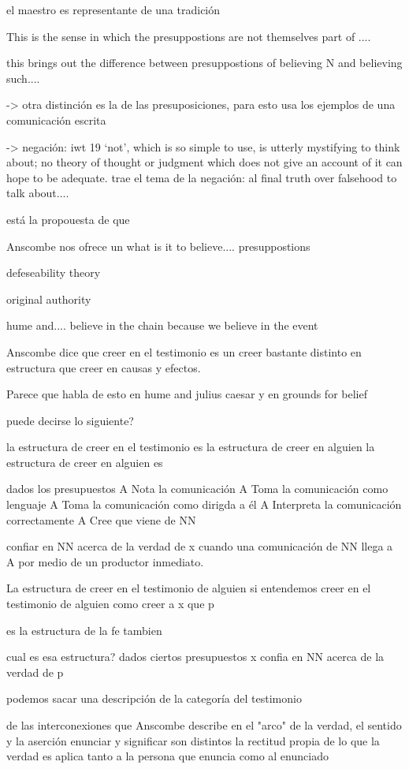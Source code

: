 el maestro es representante de una tradición

 This is the sense in which the presuppostions are not themselves part of ....

this brings out the difference between presuppostions of believing N and believing such....



-> otra distinción es la de las presuposiciones, para esto usa los ejemplos de una comunicación escrita

-> negación: iwt 19 `not', which is so simple to use, is utterly mystifying to think about; no theory of thought or judgment which does not give an account of it can hope to be adequate.
trae el tema de la negación: al final truth over falsehood to talk about....

está la propouesta de que

Anscombe nos ofrece un
what is it to believe.... presuppostions

defeseability theory

original authority

hume and.... believe in the chain because we believe in the event


Anscombe dice que creer en el testimonio es un creer bastante distinto en estructura
que creer en causas y efectos.

Parece que habla de esto en hume and julius caesar y en grounds for belief

puede decirse lo siguiente?

la estructura de creer en el testimonio es la estructura de creer en alguien
la estructura de creer en alguien es

dados los presupuestos
A Nota la comunicación
A Toma la comunicación como lenguaje
A Toma la comunicación como dirigda a él
A Interpreta la comunicación correctamente
A Cree que viene de NN

confiar en NN acerca de la verdad de x cuando una comunicación de NN llega a A por medio de un productor inmediato.

La estructura de creer en el testimonio de alguien
si entendemos creer en el testimonio de alguien como
creer a x que p

es la estructura de la fe tambien

cual es esa estructura?
dados ciertos presupuestos
x confia en NN acerca de la verdad de p

podemos sacar una descripción de
la categoría del testimonio

de las interconexiones que Anscombe describe
en el "arco" de la verdad, el sentido y la aserción
enunciar y significar son distintos
la rectitud propia de lo que la verdad es aplica tanto a la persona que enuncia como al enunciado

